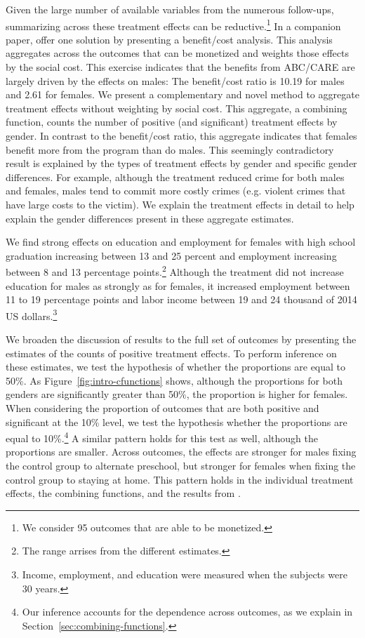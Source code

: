 Given the large number of available variables from the numerous follow-ups, summarizing across these treatment effects can be reductive.\footnote{We consider 95 outcomes that are able to be monetized.} In a companion paper, \citet{Garcia_etal_2016_Comp_CBA_Unpublished} offer one solution by presenting a benefit/cost analysis. This analysis aggregates across the outcomes that can be monetized and weights those effects by the social cost. This exercise indicates that the benefits from ABC/CARE are largely driven by the effects on males: The benefit/cost ratio is 10.19 for males and 2.61 for females. We present a complementary and novel method to aggregate treatment effects without weighting by social cost. This aggregate, a combining function, counts the number of positive (and significant) treatment effects by gender. In contrast to the benefit/cost ratio, this aggregate indicates that females benefit more from the program than do males. This seemingly contradictory result is explained by the types of treatment effects by gender and specific gender differences. For example, although the treatment reduced crime for both males and females, males tend to commit more costly crimes (e.g. violent crimes that have large costs to the victim). We explain the treatment effects in detail to help explain the gender differences present in these aggregate estimates.

We find strong effects on education and employment for females with high school graduation increasing between 13 and 25 percent and employment increasing between 8 and 13 percentage points.\footnote{The range arrises from the different estimates.} Although the treatment did not increase education for males as strongly as for females, it increased employment between 11 to 19 percentage points and labor income between 19 and 24 thousand of 2014 US dollars.\footnote{Income, employment, and education were measured when the subjects were 30 years.} 

We broaden the discussion of results to the full set of outcomes by presenting the estimates of the counts of positive treatment effects. To perform inference on these estimates, we test the hypothesis of whether the proportions are equal to 50\%. As Figure~\ref{fig:intro-cfunctions} shows, although the proportions for both genders are significantly greater than 50\%, the proportion is higher for females. When considering the proportion of outcomes that are both positive and significant at the 10\% level, we test the hypothesis whether the proportions are equal to 10\%.\footnote{Our inference accounts for the dependence across outcomes, as we explain in Section~\ref{sec:combining-functions}.} A similar pattern holds for this test as well, although the proportions are smaller. Across outcomes, the effects are stronger for males fixing the control group to alternate preschool, but stronger for females when fixing the control group to staying at home. This pattern holds in the individual treatment effects, the combining functions, and the results from \citet{Garcia_etal_2016_Comp_CBA_Unpublished}.

